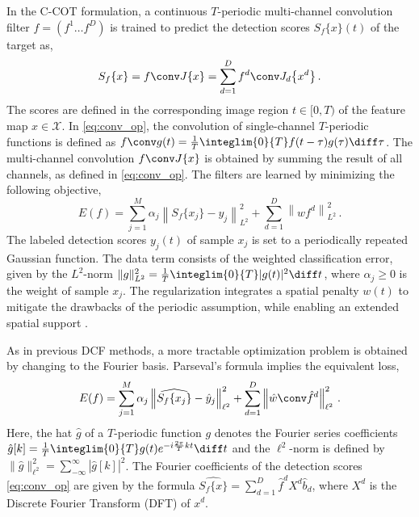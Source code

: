 \documentclass[10pt,twocolumn,letterpaper]{article}
\begin{document}
In the C-COT formulation, a continuous $T$-periodic multi-channel convolution filter $f = (f^1 \ldots f^D)$ is trained to predict the detection scores $S_f\{x\}(t)$ of the target as,
\begin{equation}
\label{eq:conv_op}
S_f\{x\} = f \conv J \{x\} = \sum_{d=1}^D f^d \conv J_d \big\{x^d\big\} \,.
\end{equation}
The scores are defined in the corresponding image region $t \in [0, T)$ of the feature map $x \in \mathcal{X}$. In \eqref{eq:conv_op}, the convolution of single-channel $T$-periodic functions is defined as $f \conv g (t) = \frac{1}{T} \integlim{0}{T} f(t - \tau) g(\tau) \diff \tau$. The multi-channel convolution $f \conv J \{x\}$ is obtained by summing the result of all channels, as defined in \eqref{eq:conv_op}. The filters are learned by minimizing the following objective,
\begin{equation}
\label{eq:loss_spatial}
E(f) = \sum_{j=1}^{M} \alpha_j \left\| S_f\{x_j\} - y_j \right\|^2_{L^2} + \sum_{d=1}^{D} \left\| w f^d \right\|^2_{L^2} \,.
\end{equation}
The labeled detection scores $y_j(t)$ of sample $x_j$ is set to a periodically repeated Gaussian function. The data term consists of the weighted classification error, given by the $L^2$-norm $\|g\|^2_{L^2} = \frac{1}{T} \integlim{0}{T} |g(t)|^2 \diff t$, where $\alpha_j \geq 0$ is the weight of sample $x_j$. The regularization integrates a spatial penalty $w(t)$ to mitigate the drawbacks of the periodic assumption, while enabling an extended spatial support \cite{DanelljanICCV2015}.


As in previous DCF methods, a more tractable optimization problem is obtained by changing to the Fourier basis. Parseval's formula implies the equivalent loss,
\begin{equation}
\label{eq:loss_fs}
E(f) = \sum_{j=1}^{M} \alpha_j \left\| \widehat{S_f\{x_j\}} - \hat{y}_j \right\|^2_{\ell^2} + \sum_{d=1}^{D} \left\|\hat{w} \conv \hat{f}^d \right\|^2_{\ell^2} \,.
\end{equation}
Here, the hat $\hat{g}$ of a $T$-periodic function $g$ denotes the Fourier series coefficients $\hat{g}[k] = \frac{1}{T} \integlim{0}{T} g(t) e^{-i \frac{2 \pi}{T} k t} \diff t$ and the $\ell^2$-norm is defined by $\| \hat{g} \|^2_{\ell^2} = \sum_{-\infty}^{\infty} |\hat{g}[k]|^2$. The Fourier coefficients of the detection scores \eqref{eq:conv_op} are given by the formula $\widehat{S_f\{x\}} = \sum_{d=1}^{D} \hat{f}^d X^d \hat{b}_d$, where $X^d$ is the Discrete Fourier Transform (DFT) of $x^d$.
\end{document}
